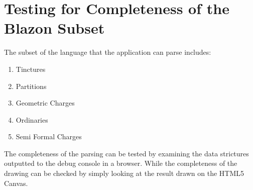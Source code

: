 \section{Testing for Completeness of the Blazon Subset}

The subset of the language that the application can parse includes:

\begin{enumerate}
  \item Tinctures
  \item Partitions
  \item Geometric Charges
  \item Ordinaries 
  \item Semi Formal Charges
\end{enumerate}



The completeness of the parsing can be tested by examining the data strictures outputted to the debug console in a browser.  While the completeness of the drawing can be checked by simply looking at the result drawn on the HTML5 Canvas. 














